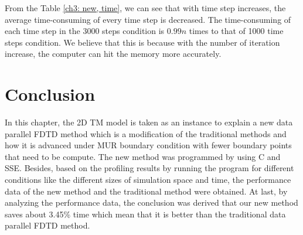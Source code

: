 From the Table \ref{ch3: new, time}, we can see that with time step increases, the average time-consuming of every time step is decreased.
The time-consuming of each time step in the 3000 steps condition is $0.99n$ times to that of 1000 time steps condition. We believe that this is because with the number of iteration increase, the computer can hit the memory more accurately.

\section{Conclusion}

In this chapter, the 2D TM model is taken as an instance to explain a new data parallel FDTD method which is a modification of the traditional methods and how it is advanced under MUR boundary condition with fewer boundary points that need to be compute. The new method was programmed by using C and SSE. Besides, based on the profiling results by running the program for different conditions like the different sizes of simulation space and time, the performance data of the new method and the traditional method were obtained. At last, by
analyzing the performance data, the conclusion was derived that our new method saves about 3.45\% time which mean that it is better than the traditional data parallel FDTD method.